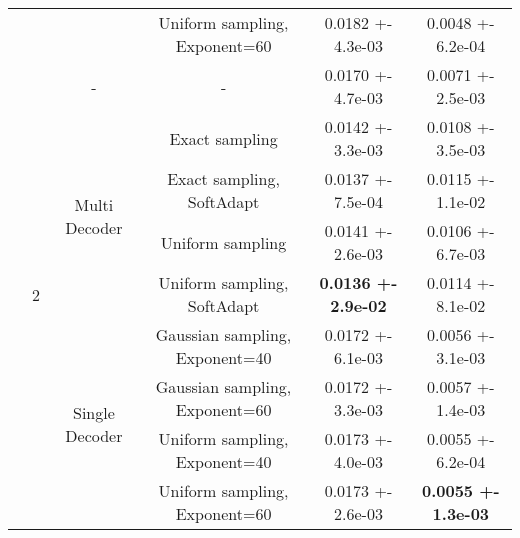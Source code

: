 \begin{tabular}{||c|c|c|c|c|c||}
\cline{4-6}
 &  &  & Uniform sampling, Exponent=60 & 0.0182 +- 4.3e-03 & 0.0048 +- 6.2e-04 \\
\cline{4-6}
\cline{3-6}
\cline{2-6}
 & \multirow{9}{*}{2} & \multirow{1}{*}{-} & - & 0.0170 +- 4.7e-03 & 0.0071 +- 2.5e-03 \\
\cline{4-6}
\cline{3-6}
 &  & \multirow{4}{*}{Multi Decoder} & Exact sampling & 0.0142 +- 3.3e-03 & 0.0108 +- 3.5e-03 \\
\cline{4-6}
 &  &  & Exact sampling, SoftAdapt & 0.0137 +- 7.5e-04 & 0.0115 +- 1.1e-02 \\
\cline{4-6}
 &  &  & Uniform sampling & 0.0141 +- 2.6e-03 & 0.0106 +- 6.7e-03 \\
\cline{4-6}
 &  &  & Uniform sampling, SoftAdapt & \textbf{0.0136 +- 2.9e-02} & 0.0114 +- 8.1e-02 \\
\cline{4-6}
\cline{3-6}
 &  & \multirow{4}{*}{Single Decoder} & Gaussian sampling, Exponent=40 & 0.0172 +- 6.1e-03 & 0.0056 +- 3.1e-03 \\
\cline{4-6}
 &  &  & Gaussian sampling, Exponent=60 & 0.0172 +- 3.3e-03 & 0.0057 +- 1.4e-03 \\
\cline{4-6}
 &  &  & Uniform sampling, Exponent=40 & 0.0173 +- 4.0e-03 & 0.0055 +- 6.2e-04 \\
\cline{4-6}
 &  &  & Uniform sampling, Exponent=60 & 0.0173 +- 2.6e-03 & \textbf{0.0055 +- 1.3e-03} \\
\cline{4-6}
\cline{3-6}
\cline{2-6}
\hline
\hline
\end{tabular}
